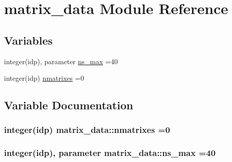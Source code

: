 \hypertarget{namespacematrix__data}{}\section{matrix\+\_\+data Module Reference}
\label{namespacematrix__data}
\subsection*{Variables}
\begin{DoxyCompactItemize}
\item 
integer(idp), parameter \hyperlink{namespacematrix__data_a4dfa98fab86e37dceb277b62ac57db1d}{ns\+\_\+max} =40
\item 
integer(idp) \hyperlink{namespacematrix__data_a57e74df9ae3223f6261e81ae1a6b8a42}{nmatrixes} =0
\end{DoxyCompactItemize}


\subsection{Variable Documentation}
\subsubsection[{\texorpdfstring{nmatrixes}{nmatrixes}}]{\setlength{\rightskip}{0pt plus 5cm}integer(idp) matrix\+\_\+data\+::nmatrixes =0}\hypertarget{namespacematrix__data_a57e74df9ae3223f6261e81ae1a6b8a42}{}\label{namespacematrix__data_a57e74df9ae3223f6261e81ae1a6b8a42}
\subsubsection[{\texorpdfstring{ns\+\_\+max}{ns_max}}]{\setlength{\rightskip}{0pt plus 5cm}integer(idp), parameter matrix\+\_\+data\+::ns\+\_\+max =40}\hypertarget{namespacematrix__data_a4dfa98fab86e37dceb277b62ac57db1d}{}\label{namespacematrix__data_a4dfa98fab86e37dceb277b62ac57db1d}
